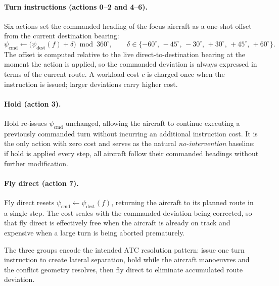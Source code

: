 \documentclass[11pt, a4paper]{article}
\begin{document}
\paragraph{Turn instructions (actions 0--2 and 4--6).}
Six actions set the commanded heading of the focus aircraft as a one-shot
offset from the current destination bearing:
\begin{equation}
    \psi_\text{cmd} \leftarrow \bigl(\psi_\text{dest}(f) + \delta\bigr)\bmod 360^\circ,
    \qquad
    \delta \in \{-60^\circ,\,-45^\circ,\,-30^\circ,\,+30^\circ,\,+45^\circ,\,+60^\circ\}.
\end{equation}
The offset is computed relative to the live direct-to-destination bearing at
the moment the action is applied, so the commanded deviation is always
expressed in terms of the current route.
A workload cost $c$ is charged once when the instruction is issued; larger
deviations carry higher cost.

\paragraph{Hold (action 3).}
Hold re-issues $\psi_\text{cmd}$ unchanged, allowing the aircraft to continue
executing a previously commanded turn without incurring an additional
instruction cost.
It is the only action with zero cost and serves as the natural
\textit{no-intervention} baseline: if hold is applied every step, all
aircraft follow their commanded headings without further modification.

\paragraph{Fly direct (action 7).}
Fly direct resets $\psi_\text{cmd} \leftarrow \psi_\text{dest}(f)$,
returning the aircraft to its planned route in a single step.
The cost scales with the commanded deviation being corrected, so that
fly direct is effectively free when the aircraft is already on track
and expensive when a large turn is being aborted prematurely.

\medskip
The three groups encode the intended ATC resolution pattern: issue one turn
instruction to create lateral separation, hold while the aircraft manoeuvres
and the conflict geometry resolves, then fly direct to eliminate accumulated
route deviation.
\end{document}
